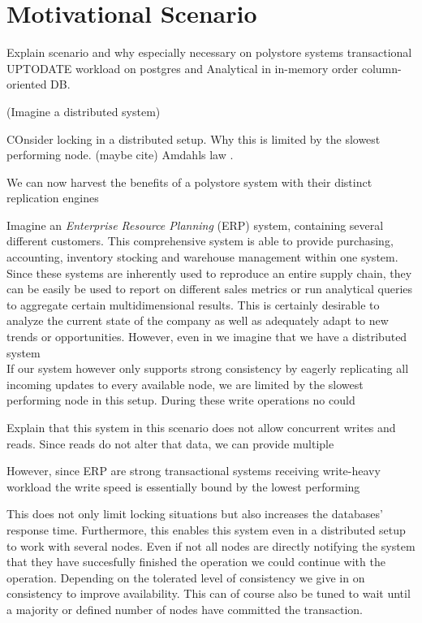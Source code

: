 \chapter{Motivational Scenario}
\label{c:motivation}

Explain scenario and why especially necessary on polystore systems
transactional UPTODATE workload on postgres and 
Analytical in in-memory order column-oriented DB. 

(Imagine a distributed system)

COnsider locking in a distributed setup. Why this is limited by the slowest performing node.
(maybe cite) Amdahls law .

We can now harvest the benefits of a polystore system with their distinct replication engines

Imagine an \emph{Enterprise Resource Planning} (ERP) system, containing several different customers.
This comprehensive system is able to provide purchasing, accounting, inventory stocking and warehouse management within one system.
Since these systems are inherently used to reproduce an entire supply chain, they can be easily be used to report on different sales metrics
or run analytical queries to aggregate certain multidimensional results. This is certainly desirable to analyze the current state of the company as well as adequately adapt 
to new trends or opportunities. However, even in we imagine that we have a distributed system \\
If our system however only supports strong consistency by eagerly replicating all incoming updates to every available node, 
we are limited by the slowest performing node in this setup. During these write operations no could

Explain that this system in this scenario does not allow concurrent writes and reads. Since reads do not alter that data, we can provide multiple 


However, since ERP  are strong transactional systems receiving write-heavy workload the write speed is essentially bound by the lowest performing

This does not only limit locking situations but also increases the databases' response time. Furthermore, this enables this system even in a distributed setup to work 
with several nodes. Even if not all nodes are directly notifying the system that they have succesfully finished the operation we could continue with the operation.
Depending on the tolerated level of consistency we give in on consistency to improve availability. This can of course also be tuned to wait until a majority or defined number of nodes 
have committed the transaction.

